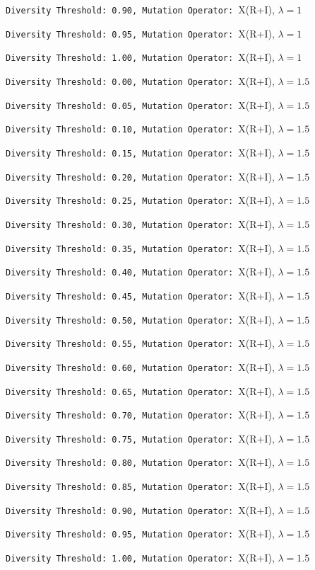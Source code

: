 \documentclass{article}
\begin{document}

\newpage
\verb|Diversity Threshold: 0.90, Mutation Operator: |X(R+I), $\lambda=1$

\newpage
\verb|Diversity Threshold: 0.95, Mutation Operator: |X(R+I), $\lambda=1$

\newpage
\verb|Diversity Threshold: 1.00, Mutation Operator: |X(R+I), $\lambda=1$

\newpage
\verb|Diversity Threshold: 0.00, Mutation Operator: |X(R+I), $\lambda=1.5$

\newpage
\verb|Diversity Threshold: 0.05, Mutation Operator: |X(R+I), $\lambda=1.5$

\newpage
\verb|Diversity Threshold: 0.10, Mutation Operator: |X(R+I), $\lambda=1.5$

\newpage
\verb|Diversity Threshold: 0.15, Mutation Operator: |X(R+I), $\lambda=1.5$

\newpage
\verb|Diversity Threshold: 0.20, Mutation Operator: |X(R+I), $\lambda=1.5$

\newpage
\verb|Diversity Threshold: 0.25, Mutation Operator: |X(R+I), $\lambda=1.5$

\newpage
\verb|Diversity Threshold: 0.30, Mutation Operator: |X(R+I), $\lambda=1.5$

\newpage
\verb|Diversity Threshold: 0.35, Mutation Operator: |X(R+I), $\lambda=1.5$

\newpage
\verb|Diversity Threshold: 0.40, Mutation Operator: |X(R+I), $\lambda=1.5$

\newpage
\verb|Diversity Threshold: 0.45, Mutation Operator: |X(R+I), $\lambda=1.5$

\newpage
\verb|Diversity Threshold: 0.50, Mutation Operator: |X(R+I), $\lambda=1.5$

\newpage
\verb|Diversity Threshold: 0.55, Mutation Operator: |X(R+I), $\lambda=1.5$

\newpage
\verb|Diversity Threshold: 0.60, Mutation Operator: |X(R+I), $\lambda=1.5$

\newpage
\verb|Diversity Threshold: 0.65, Mutation Operator: |X(R+I), $\lambda=1.5$

\newpage
\verb|Diversity Threshold: 0.70, Mutation Operator: |X(R+I), $\lambda=1.5$

\newpage
\verb|Diversity Threshold: 0.75, Mutation Operator: |X(R+I), $\lambda=1.5$

\newpage
\verb|Diversity Threshold: 0.80, Mutation Operator: |X(R+I), $\lambda=1.5$

\newpage
\verb|Diversity Threshold: 0.85, Mutation Operator: |X(R+I), $\lambda=1.5$

\newpage
\verb|Diversity Threshold: 0.90, Mutation Operator: |X(R+I), $\lambda=1.5$

\newpage
\verb|Diversity Threshold: 0.95, Mutation Operator: |X(R+I), $\lambda=1.5$

\newpage
\verb|Diversity Threshold: 1.00, Mutation Operator: |X(R+I), $\lambda=1.5$

\newpage
\end{document}
